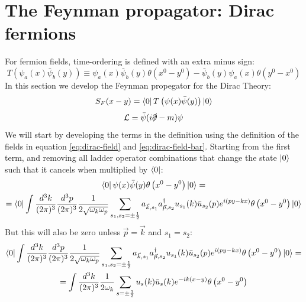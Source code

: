 \documentclass{article}
\begin{document}
\section{The Feynman propagator: Dirac fermions}
For fermion fields, time-ordering is defined with an extra minus sign:
\begin{equation}
    T\left(\psi_a(x)\bar{\psi}_b(y)\right) \equiv
    \psi_a(x)\bar{\psi}_b(y)\theta\left(x^0 - y^0\right) -
    \bar{\psi}_b(y)\psi_a(x)\theta\left(y^0 - x^0\right)
\end{equation}
In this section we develop the Feynman propegator for the Dirac Theory:
\begin{equation}
    S_F(x-y) = \bra{0} T\left(\psi(x)\bar{\psi}(y)\right) \ket{0}
\end{equation}
\begin{equation}
    \mathcal{L} = \bar{\psi}(i\slashed{\partial} - m)\psi
\end{equation}
We will start by developing the terms in the definition using the definition of the fields in equation \ref{eq:dirac-field} and \ref{eq:dirac-field-bar}. Starting from the first term, and removing all ladder operator combinations that change the state $\ket{0}$ such that it cancels when multiplied by $\bra{0}$:
\begin{equation}
\begin{gathered}
    \bra{0}\psi(x)\bar{\psi}(y)\theta\left(x^0 - y^0\right)\ket{0} = \\ =
    \bra{0}
    \int \frac{d^3k}{(2\pi)^3} \frac{d^3p}{(2\pi)^3} \frac{1}{2\sqrt{\omega_k\omega_p}}\sum_{s_1, s_2=\pm\frac{1}{2}}
        a_{\vec{k}, s_1}a_{\vec{p}, s_2}^\dagger u_{s_1}(k) \bar{u}_{s_2}(p)e^{i(py - kx)}
    \theta\left(x^0 - y^0\right)\ket{0}
\end{gathered}
\end{equation}
But this will also be zero unless $\vec{p} = \vec{k}$ and $s_1 = s_2$:
\begin{equation}
\begin{gathered}
    \bra{0}
    \int \frac{d^3k}{(2\pi)^3} \frac{d^3p}{(2\pi)^3} \frac{1}{2\sqrt{\omega_k\omega_p}}\sum_{s_1, s_2=\pm\frac{1}{2}}
        a_{\vec{k}, s_1}a_{\vec{p}, s_2}^\dagger u_{s_1}(k) \bar{u}_{s_2}(p)e^{i(py - kx)}
    \theta\left(x^0 - y^0\right)\ket{0}
    = \\ =
    \int \frac{d^3k}{(2\pi)^3} \frac{1}{2\omega_k}\sum_{s=\pm\frac{1}{2}}
        u_s(k) \bar{u}_s(k)e^{-ik(x - y)}
    \theta\left(x^0 - y^0\right)
\end{gathered}
\end{equation}
\end{document}
